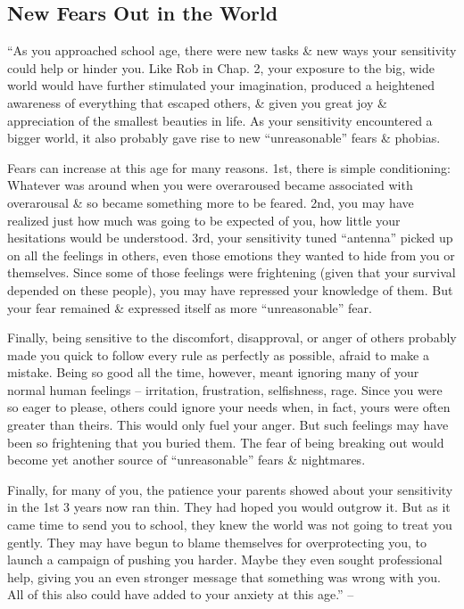 \documentclass{article}
\numberwithin{equation}{section}
\begin{document}
\subsection{New Fears Out in the World}
``As you approached school age, there were new tasks \& new ways your sensitivity could help or hinder you. Like Rob in Chap. 2, your exposure to the big, wide world would have further stimulated your imagination, produced a heightened awareness of everything that escaped others, \& given you great joy \& appreciation of the smallest beauties in life. As your sensitivity encountered a bigger world, it also probably gave rise to new ``unreasonable'' fears \& phobias.

Fears can increase at this age for many reasons. 1st, there is simple conditioning: Whatever was around when you were overaroused became associated with overarousal \& so became something more to be feared. 2nd, you may have realized just how much was going to be expected of you, how little your hesitations would be understood. 3rd, your sensitivity tuned ``antenna'' picked up on all the feelings in others, even those emotions they wanted to hide from you or themselves. Since some of those feelings were frightening (given that your survival depended on these people), you may have repressed your knowledge of them. But your fear remained \& expressed itself as more ``unreasonable'' fear.

Finally, being sensitive to the discomfort, disapproval, or anger of others probably made you quick to follow every rule as perfectly as possible, afraid to make a mistake. Being so good all the time, however, meant ignoring many of your normal human feelings -- irritation, frustration, selfishness, rage. Since you were so eager to please, others could ignore your needs when, in fact, yours were often greater than theirs. This would only fuel your anger. But such feelings may have been so frightening that you buried them. The fear of being breaking out would become yet another source of ``unreasonable'' fears \& nightmares.

Finally, for many of you, the patience your parents showed about your sensitivity in the 1st 3 years now ran thin. They had hoped you would outgrow it. But as it came time to send you to school, they knew the world was not going to treat you gently. They may have begun to blame themselves for overprotecting you, to launch a campaign of pushing you harder. Maybe they even sought professional help, giving you an even stronger message that something was wrong with you. All of this also could have added to your anxiety at this age.'' -- \cite[pp. 107--108]{Aron2013}
\end{document}
